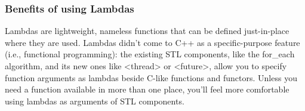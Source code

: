 \subsubsection{Benefits of using Lambdas}
Lambdas are lightweight, nameless functions that can be defined just-in-place where they are used. Lambdas didn't come to C++ as a specific-purpose feature (i.e., functional programming): the existing STL components, like the for\_each algorithm, and its new ones like <thread> or <future>, allow you to specify function arguments as lambdas beside C-like functions and functors. Unless you need a function available in more than one place, you'll feel more comfortable using lambdas as arguments of STL components.

